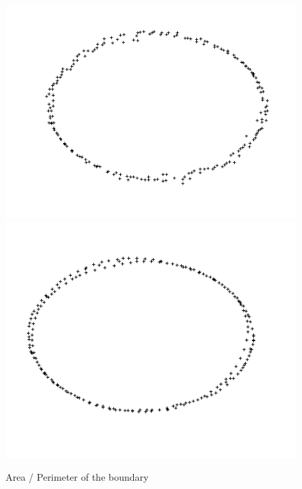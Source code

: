 \documentclass{beamer}
\begin{document}
\begin{frame}
\begin{figure}
        \includegraphics[scale=0.22]{img/ellipse-200-noised-var-1-perimeter}
        \includegraphics[scale=0.22]{img/ellipse-noised-perimeter-7-2}
        \caption{Area / Perimeter of the boundary}
    \end{figure}
\end{frame}
\end{document}
